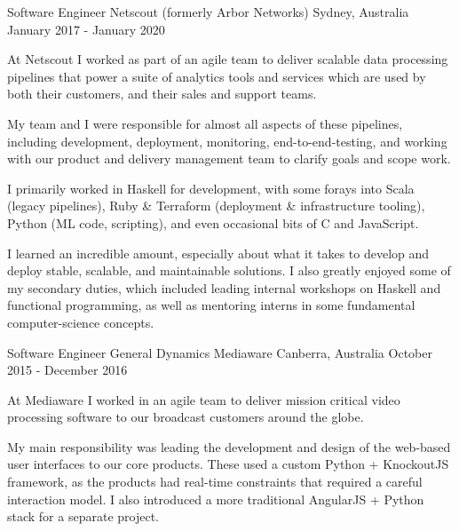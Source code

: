 \begin{cventries}
\cventry
{Software Engineer} %
{Netscout (formerly Arbor Networks)} %
{Sydney, Australia} %
{January 2017 - January 2020 } %
{ %
\begin{cvitems}
\item {At Netscout I worked as part of an agile team to deliver scalable data processing pipelines that power a suite of analytics tools and services which are used by both their customers, and their sales and support teams.}
\item {My team and I were responsible for almost all aspects of these pipelines, including development, deployment, monitoring, end-to-end-testing, and working with our product and delivery management team to clarify goals and scope work.}
\item {I primarily worked in Haskell for development, with some forays into Scala (legacy pipelines), Ruby \& Terraform (deployment \& infrastructure tooling), Python (ML code, scripting), and even occasional bits of C and JavaScript.}
\item {I learned an incredible amount, especially about what it takes to develop and deploy stable, scalable, and maintainable solutions. I also greatly enjoyed some of my secondary duties, which included leading internal workshops on Haskell and functional programming, as well as mentoring interns in some fundamental computer-science concepts.}
\end{cvitems}
\vspace{2.0mm}
}


\cventry
{Software Engineer} %
{General Dynamics Mediaware} %
{Canberra, Australia} %
{October 2015 - December 2016} %
{ %
\begin{cvitems}
  \item {At Mediaware I worked in an agile team to deliver mission critical video processing software to our broadcast customers around the globe.}
  \item {My main responsibility was leading the development and design of the web-based user interfaces to our core products. These used a custom Python + KnockoutJS framework, as the products had real-time constraints that required a careful interaction model. I also introduced a more traditional AngularJS + Python stack for a separate project.}
\end{cvitems}
\vspace{2.0mm}
}


\end{cventries}
